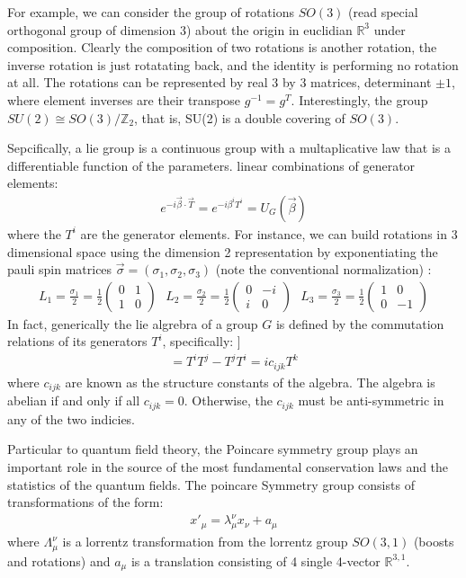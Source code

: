 For example, we can consider the group of rotations $SO(3)$ (read special orthogonal group of
dimension 3) about the origin in euclidian $\mathbb{R}^3$ under composition. Clearly the composition
of two rotations is another rotation, the inverse rotation is just rotatating back, and the identity is
performing no rotation at all. The rotations can be represented by real 3 by 3 matrices, determinant $\pm 1$, 
where element inverses are their transpose $g^{-1}=g^T$. Interestingly, the group $SU(2) \cong SO(3) / \mathbb{Z}_2$, that is, SU(2) is a double covering of $SO(3)$. 

Sepcifically, a lie group is a continuous group with a multaplicative 
law that is a differentiable function of the parameters. linear combinations of generator elements:
\begin{align*}
e^{-i\vec \beta \cdot \vec T} = e^{-i\beta^i T^i} = U_{G}(\vec \beta)
\end{align*}
where the $T^i$ are the generator elements. 
For instance, we can build rotations in 3 dimensional space 
using the dimension 2 representation by exponentiating the pauli spin matrices $\vec \sigma = (\sigma_1, \sigma_2, \sigma_3)$ 
(note the conventional normalization) :
\begin{align*}
L_1 = \frac{\sigma_1}{2} = \frac{1}{2} \begin{pmatrix} 0 & 1 \\ 1 & 0 \end{pmatrix} \text{  }
L_2 = \frac{\sigma_2}{2} = \frac{1}{2} \begin{pmatrix} 0 & -i \\ i & 0 \end{pmatrix} \text{  } 
L_3 = \frac{\sigma_3}{2} =  \frac{1}{2} \begin{pmatrix} 1 & 0 \\ 0 & -1 \end{pmatrix} 
\end{align*}
In fact, generically the lie algrebra of a group $G$ is defined by the commutation relations of its generators $T^i$, 
specifically:
]\begin{align*}
[T^i, T^j] = T^iT^j - T^jT^i=  i c_{ijk} T^k
\end{align*}
where $c_{ijk}$ are known as the structure constants of the algebra. The algebra is abelian 
if and only if all $c_{ijk}=0$. Otherwise, the $c_{ijk}$ must be anti-symmetric in any of the two indicies. 

Particular to quantum field theory, the Poincare symmetry group plays an important role in the 
source of the most fundamental conservation laws and the statistics of the quantum fields. 
The poincare Symmetry group consists of transformations of the form:
\begin{align*}
x'_\mu = \lambda^\nu_\mu x_\nu + a_\mu 
\end{align*}
where $\Lambda^\nu_\mu$ is a lorrentz transformation from the lorrentz group $SO(3,1)$ (boosts and rotations) and 
$a_\mu$ is a translation consisting of 4 single 4-vector $\mathbb{R}^{3,1}$. 

